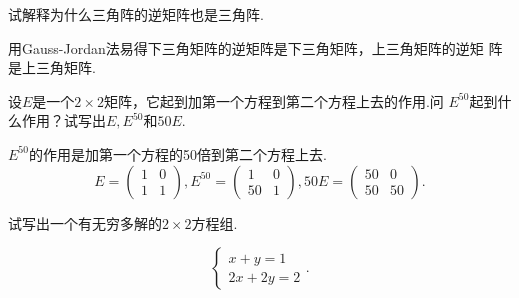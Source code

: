 ﻿\documentclass{book} \usepackage{exsheets} \usepackage{xeCJK}
\begin{document}
\begin{question}
试解释为什么三角阵的逆矩阵也是三角阵.
\end{question}
\begin{solution}
 用Gauss-Jordan法易得下三角矩阵的逆矩阵是下三角矩阵，上三角矩阵的逆矩
 阵是上三角矩阵.
\end{solution}
\begin{question}
  设$E$是一个$2\times 2$矩阵，它起到加第一个方程到第二个方程上去的作用.问
  $E^{50}$起到什么作用？试写出$E,E^{50}$和$50E$.
\end{question}
\begin{solution}
  $E^{50}$的作用是加第一个方程的50倍到第二个方程上去.
$$
E=
\begin{pmatrix}
  1&0\\
1&1
\end{pmatrix},E^{50}=
\begin{pmatrix}
  1&0\\
50&1
\end{pmatrix},50E=
\begin{pmatrix}
  50&0\\
50&50
\end{pmatrix}.
$$
\end{solution}
\begin{question}
  试写出一个有无穷多解的$2\times 2$方程组.
\end{question}
\begin{solution}
$$
\begin{cases}
  x+y=1\\
2x+2y=2
\end{cases}.
$$
\end{solution}
\end{document}
